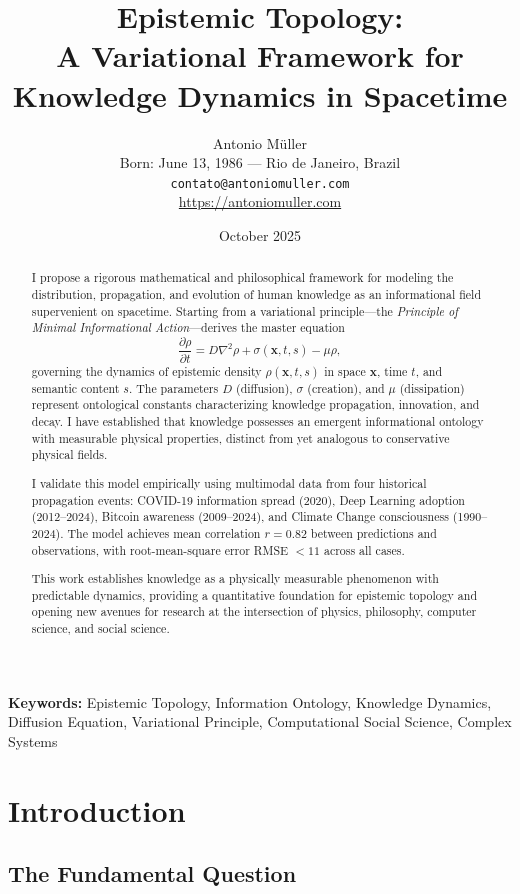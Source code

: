 \documentclass[12pt]{article}
\title{\textbf{Epistemic Topology:}\\
A Variational Framework for Knowledge Dynamics in Spacetime}
\author{
Antonio Müller\\
\small Born: June 13, 1986 --- Rio de Janeiro, Brazil\\
\small \texttt{contato@antoniomuller.com}\\
\small \url{https://antoniomuller.com}
}
\date{\small October 2025}
\begin{document}
\maketitle

\begin{abstract}
I propose a rigorous mathematical and philosophical framework for modeling the distribution, propagation, and evolution of human knowledge as an informational field supervenient on spacetime. Starting from a variational principle---the \emph{Principle of Minimal Informational Action}---derives the master equation
\[
\frac{\partial \rho}{\partial t} = D \nabla^2 \rho + \sigma(\mathbf{x},t,s) - \mu \rho,
\]
governing the dynamics of epistemic density $\rho(\mathbf{x},t,s)$ in space $\mathbf{x}$, time $t$, and semantic content $s$. 
The parameters $D$ (diffusion), $\sigma$ (creation), and $\mu$ (dissipation) represent ontological constants characterizing knowledge propagation, innovation, and decay. I have established that knowledge possesses an emergent informational ontology with measurable physical properties, distinct from yet analogous to conservative physical fields.

I validate this model empirically using multimodal data from four historical propagation events: COVID-19 information spread (2020), Deep Learning adoption (2012--2024), Bitcoin awareness (2009--2024), and Climate Change consciousness (1990--2024). The model achieves mean correlation $r = 0.82$ between predictions and observations, with root-mean-square error RMSE $< 11$ across all cases.

This work establishes knowledge as a physically measurable phenomenon with predictable dynamics, providing a quantitative foundation for epistemic topology and opening new avenues for research at the intersection of physics, philosophy, computer science, and social science.
\end{abstract}

\noindent\textbf{Keywords:} Epistemic Topology, Information Ontology, Knowledge Dynamics, Diffusion Equation, Variational Principle, Computational Social Science, Complex Systems

\section{Introduction}

\subsection{The Fundamental Question}
\end{document}
